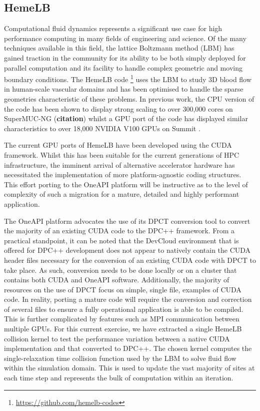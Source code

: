 



\subsection{HemeLB}
Computational fluid dynamics represents a significant use case for high performance computing in many fields of engineering and science. Of the many techniques available in this field, the lattice Boltzmann method (LBM) has gained traction in the community for its ability to be both simply deployed for parallel computation and its facility to handle complex geometric and moving boundary conditions. The HemeLB code \footnote{\url{https://github.com/hemelb-codes}} uses the LBM to study 3D blood flow in human-scale vascular domains and has been optimised to handle the sparse geometries characteristic of these problems. In previous work, the CPU version of the code has been shown to display strong scaling to over 300,000 cores on SuperMUC-NG (\textbf{citation}) whilst a GPU port of the code has displayed similar characteristics to over 18,000 NVIDIA V100 GPUs on Summit \cite{zacharoudiou_development_2022}.

The current GPU ports of HemeLB have been developed using the CUDA framework. Whilst this has been suitable for the current generations of HPC infrastructure, the imminent arrival of alternative accelerator hardware has necessitated the implementation of more platform-agnostic coding structures. This effort porting to the OneAPI platform will be instructive as to the level of complexity of such a migration for a mature, detailed and highly performant application.

The OneAPI platform advocates the use of its DPCT conversion tool to convert the majority of an existing CUDA code to the DPC++ framework. From a practical standpoint, it can be noted that the DevCloud environment that is offered for DPC++ development does not appear to natively contain the CUDA header files necessary for the conversion of an existing CUDA code with DPCT to take place. As such, conversion needs to be done locally or on a cluster that contains both CUDA and OneAPI software. Additionally, the majority of resources on the use of DPCT focus on simple, single file, examples of CUDA code. In reality, porting a mature code will require the conversion and correction of several files to ensure a fully operational application is able to be compiled. This is further complicated by features such as MPI communication between multiple GPUs. For this current exercise, we have extracted a single HemeLB collision kernel to test the performance variation between a native CUDA implementation and that converted to DPC++. The chosen kernel computes the single-relaxation time collision function used by the LBM to solve fluid flow within the simulation domain. This is used to update the vast majority of sites at each time step and represents the bulk of computation within an iteration.


